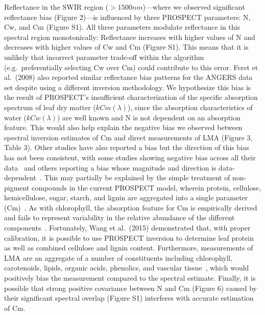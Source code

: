 Reflectance in the SWIR region ($>1500 nm$)---where we observed significant reflectance bias (Figure 2)---is influenced by three PROSPECT parameters: N, Cw, and Cm (Figure S1). %
All three parameters modulate reflectance in this spectral region monotonically: 
Reflectance increases with higher values of N and decreases with higher values of Cw and Cm (Figure S1). %
This means that it is unlikely that incorrect parameter trade-off within the algorithm (e.g.\ preferentially selecting Cw over Cm) could contribute to this error.
Feret et al.~(2008) also reported similar reflectance bias patterns for the ANGERS data set despite using a different inversion methodology. \nocite{feret_2008_prospect}
We hypothesize this bias is the result of PROSPECT’s insufficient characterization of the specific absorption spectrum of leaf dry matter ($kCm(\lambda)$),
since the absorption characteristics of water ($kCw(\lambda)$) are well known and N is not dependent on an absorption feature.
This would also help explain the negative bias we observed between spectral inversion estimates of Cm and direct measurements of LMA (Figure 3, Table 3). %
Other studies have also reported a bias but the direction of this bias has not been consistent, with some studies showing negative bias across all their data~\cite{li_2011_retrieval,cheng_2014_deriving} and others reporting a bias whose magnitude and direction is data-dependent~\cite{feret_2008_prospect}.
This may partially be explained by the simple treatment of non-pigment compounds in the current PROSPECT model, wherein protein, cellulose, hemicellulose, sugar, starch, and lignin are aggregated into a single parameter (Cm)~\cite{fourty_1996_leaf}.
As with chlorophyll, the absorption feature for Cm is empirically derived~\cite{feret_2008_prospect} and fails to represent variability in the relative abundance of the different components~\cite{poorter_causes_2009}.
Fortunately, Wang et al.~(2015) demonstrated that, with proper calibration, it is possible to use PROSPECT inversion to determine leaf protein as well as combined cellulose and lignin content. \nocite{wang_2015_applicability}
Furthermore, measurements of LMA are an aggregate of a number of constituents including chlorophyll, carotenoids, lipids, organic acids, phenolics, and vascular tissue~\cite{poorter_causes_2009}, which would positively bias the measurement compared to the spectral estimate.
Finally, it is possible that strong positive covariance between N and Cm (Figure 6) caused by their significant spectral overlap (Figure S1) interferes with accurate estimation of Cm. %
